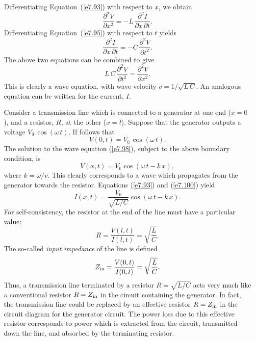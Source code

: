 Differentiating Equation~(\ref{e7.93}) with respect to $x$, we obtain
\begin{equation}
\frac{\partial^2 V}{\partial x^2} = - L\, \frac{\partial^2 I}{\partial x\, \partial t}.
\end{equation}
Differentiating Equation~(\ref{e7.95}) with respect to $t$ yields
\begin{equation}
\frac{\partial^2 I}{\partial x\, \partial t} = 
-C\,\frac{\partial^2 V}{\partial t^2}.
\end{equation}
The above two equations can be combined to give
\begin{equation}\label{e7.98}
L\,C\,\frac{\partial^2 V}{\partial t^2} = \frac{\partial^2 V}{\partial x^2}.
\end{equation}
This is clearly a wave equation, with wave velocity  $v= 1/\sqrt{L\,C}$. An
analogous equation can be written for the current, $I$.

Consider a transmission line which is connected to a generator at one end 
($x=0$), and
a resistor, $R$, at the other ($x=l$). Suppose that the generator outputs
a voltage $V_0 \,\cos(\omega\, t)$. If follows that
\begin{equation}
V(0, t) = V_0\, \cos(\omega\, t).
\end{equation}
The solution to the wave equation (\ref{e7.98}), subject to the above boundary condition, is
\begin{equation}\label{e7.100}
V(x, t) = V_0 \cos(\omega\, t - k\,x),
\end{equation}
where $k= \omega / v$. This clearly corresponds to a wave which propagates
from the generator towards the resistor. Equations (\ref{e7.93}) and (\ref{e7.100}) yield
\begin{equation}
I(x, t)  = \frac{V_0}{\sqrt{L/C}} \cos(\omega \,t -k\,x).
\end{equation}
For self-consistency, the resistor at the end of the line must have a particular 
value:
\begin{equation}
R = \frac{V(l, t)}{I(l, t)} = \sqrt{\frac{L}{C}}.
\end{equation}
The  so-called  {\em input impedance} of the line is defined
\begin{equation}
Z_{\rm in} = \frac{V(0, t)}{I(0, t)} = \sqrt{\frac{L}{C}}.
\end{equation}
Thus, a transmission line terminated by a resistor $R= \sqrt{L/C}$ acts very
much like a conventional resistor $R=  Z_{\rm in}$ in the circuit containing
the generator. In fact, the transmission line could be replaced by an effective
resistor $R=  Z_{\rm in}$ in the circuit diagram for the generator circuit.
The power loss due to this effective resistor corresponds to power which
is extracted from the circuit, transmitted down the line, and absorbed by the
terminating resistor. 

